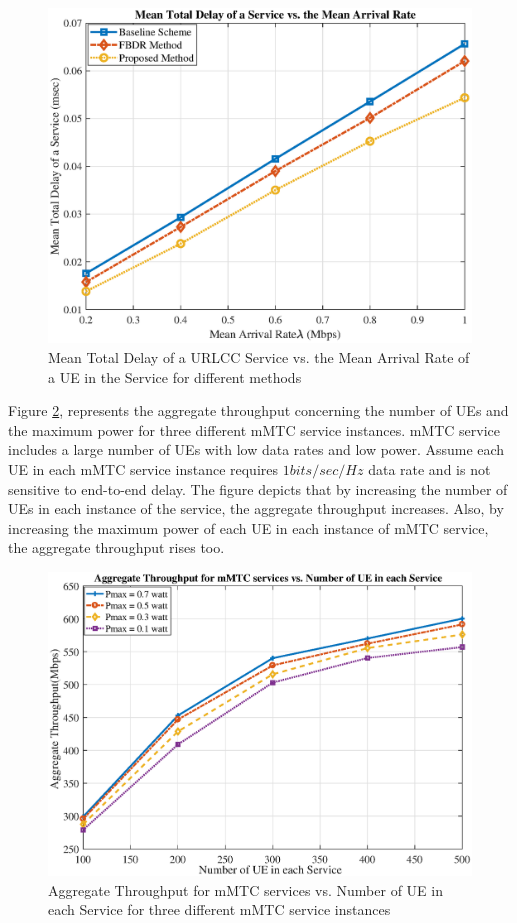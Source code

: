 \documentclass[conference]{IEEEtran}
\begin{document}
\begin{figure}
  \centering 
    \includegraphics[scale = 0.5]{delay1_new.eps}
  \caption{Mean Total Delay of a URLCC Service vs. the Mean Arrival Rate of a UE in the Service for different methods}
  \label{fig:7}
\end{figure}

Figure \ref{fig:8}, represents the aggregate throughput concerning the number of UEs and the maximum power for three different mMTC service instances. mMTC service includes a large number of UEs with low data rates and low power.
Assume each UE in each mMTC service instance requires $1bits/sec/Hz$ data rate and is not sensitive to end-to-end delay. The figure depicts that by increasing the number of UEs in each instance of the service, the aggregate throughput increases. Also, by increasing the maximum power of each UE in each instance of mMTC service, the aggregate throughput rises too.
\begin{figure}
    \includegraphics[scale = 0.42]{mmTCpower.eps}
  \caption{Aggregate Throughput for mMTC services vs. Number of UE in each Service for three different mMTC service instances}
  \label{fig:8}
\end{figure}
\end{document}

